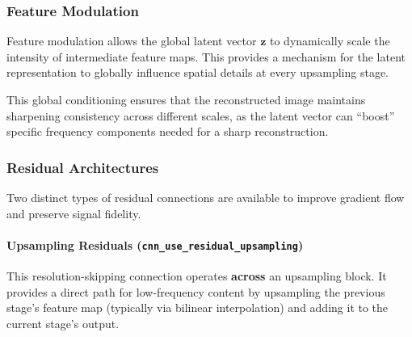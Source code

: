 \documentclass[11pt]{article}
\begin{document}
\subsubsection{Feature Modulation}
Feature modulation allows the global latent vector $\mathbf{z}$ to dynamically scale the intensity of intermediate feature maps. This provides a mechanism for the latent representation to globally influence spatial details at every upsampling stage.

\begin{center}
\end{center}

This global conditioning ensures that the reconstructed image maintains sharpening consistency across different scales, as the latent vector can ``boost'' specific frequency components needed for a sharp reconstruction.

\subsubsection{Residual Architectures}
Two distinct types of residual connections are available to improve gradient flow and preserve signal fidelity.

\paragraph{Upsampling Residuals (\texttt{cnn\_use\_residual\_upsampling})}
This resolution-skipping connection operates \textbf{across} an upsampling block. It provides a direct path for low-frequency content by upsampling the previous stage's feature map (typically via bilinear interpolation) and adding it to the current stage's output. 
\end{document}
